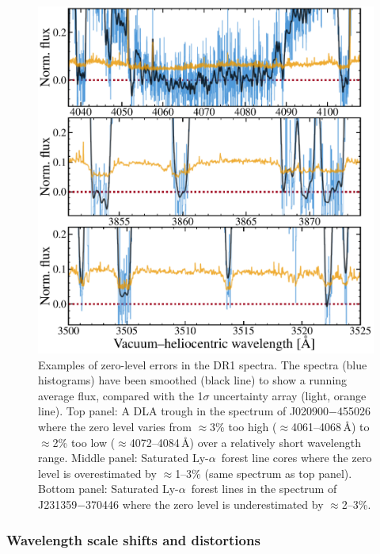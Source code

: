\documentclass[fleqn,usenatbib,usedcolumn]{mnras}
\newcommand{\lya}{\ensuremath{\textrm{Ly-}\alpha}}
\begin{document}
\begin{figure}
\begin{center}
\includegraphics[width=0.90\columnwidth]{DR1_zero_level.pdf}
\vspace{-1em}
\caption{Examples of zero-level errors in the DR1 spectra. The spectra (blue histograms) have been smoothed (black line) to show a running average flux, compared with the 1$\sigma$ uncertainty array (light, orange line). Top panel: A DLA trough in the spectrum of J020900$-$455026 where the zero level varies from $\approx$3\% too high ($\approx$4061--4068\,\AA) to $\approx$2\% too low ($\approx$4072--4084\,\AA) over a relatively short wavelength range. Middle panel: Saturated \lya\ forest line cores where the zero level is overestimated by $\approx$1--3\% (same spectrum as top panel). Bottom panel: Saturated \lya\ forest lines in the spectrum of J231359$-$370446 where the zero level is underestimated by $\approx$2--3\%.}
\label{f:zero}
\end{center}
\end{figure}


\subsubsection{Wavelength scale shifts and distortions}\label{sss:wave}
\end{document}
